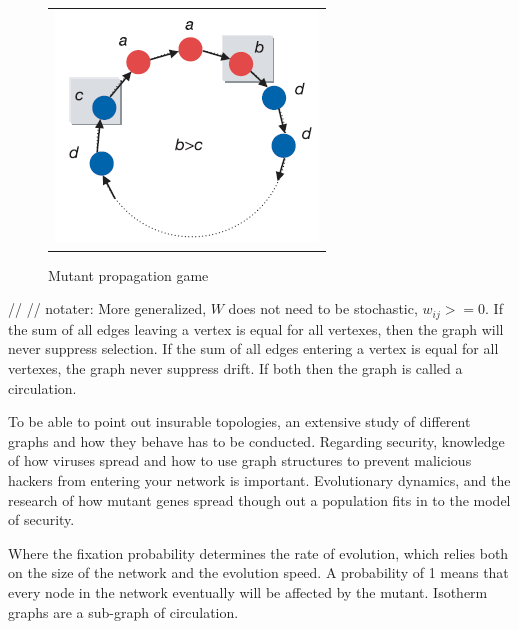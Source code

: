 \begin{figure}
\centering
\begin{tabular}{@{}c@{}}
\includegraphics[width=1.0\textwidth]{natureGameSingle.png}
\end{tabular}
\caption{\label{fig:game} Mutant propagation game}
\end{figure}


//
//
 notater:
More generalized, $W$ does not need to be stochastic, $w_{ij}>=0$. 
If the sum of all edges leaving a vertex is equal for all vertexes, then the graph will never suppress selection.
If the sum of all edges entering a vertex is equal for all vertexes, the graph never suppress drift.
If both then the graph is called a circulation.
     
To be able to point out insurable topologies, an extensive study of different graphs and how they behave has to be conducted. Regarding security, knowledge of how viruses spread and how to use graph structures to prevent malicious hackers from entering your network is important. Evolutionary dynamics, and the research of how mutant genes spread though out a population fits in to the model of security. 

Where the fixation probability determines the rate of evolution, which relies both on the size of the network and the evolution speed. A probability of 1 means that every node in the network eventually will be affected by the mutant.   
Isotherm graphs are a sub-graph of circulation. 

